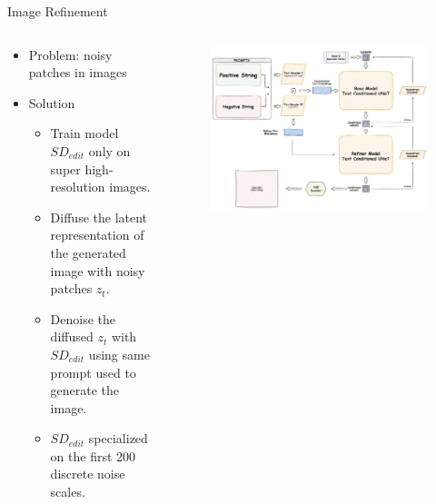 \documentclass[8pt]{beamer}
\begin{document}
\begin{frame}{Image Refinement}
    \begin{columns}
        \begin{column}{0.4\textwidth}
            \fontsize{7pt}{7pt}\selectfont
            \begin{itemize}
                \item Problem: noisy patches in images
                \item Solution
                \begin{itemize}
                    \item Train model $SD_{edit}$ only on super high-resolution images.
                    \item Diffuse the latent representation of the generated image with noisy patches $z_t$.
                    \item Denoise the diffused $z_t$ with $SD_{edit}$ using same prompt used to generate the image.
                    \item $SD_{edit}$ specialized on the first 200 discrete noise scales.
                \end{itemize}
            \end{itemize}
        \end{column}
        \begin{column}{0.6\textwidth}
           \begin{figure}
               \includegraphics[scale=0.13]{images/sdxl_architecture}
               \label{fig:sdxl_architecture}
           \end{figure}~\cite{demir}
        \end{column}
    \end{columns}
\end{frame}
\end{document}
